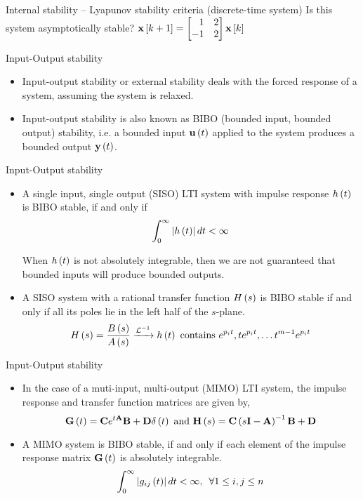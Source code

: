 \documentclass[aspectratio=169]{beamer}
\def\mf{\ensuremath\mathbf}
\def\lp{\ensuremath\left(}
\def\rp{\ensuremath\right)}
\def\lv{\ensuremath\left\lvert}
\def\rv{\ensuremath\right\rvert}
\def\ls{\ensuremath\left[}
\def\rs{\ensuremath\right]}
\def\bmx{\ensuremath\begin{bmatrix*}[r]}
\def\emx{\ensuremath\end{bmatrix*}}
\newcommand{\ct}[1]{\lp #1\rp}
\newcommand{\dt}[1]{\ls #1\rs}
\begin{document}
\begin{frame}[t]{Internal stability -- Lyapunov stability criteria (discrete-time system)}
Is this system asymptotically stable? $\mf{x}\dt{k+1} = \bmx 1 & 2 \\ -1 & 2 \emx\mf{x}\dt{k}$
\end{frame}


\begin{frame}[t]{Input-Output stability}
\begin{itemize}
    \item Input-output stability or external stability deals with the forced response of a system, assuming the system is relaxed.

    \item Input-output stability is also known as BIBO (bounded input, bounded output) stability, i.e. a bounded input $\mf{u}\ct{t}$ applied to the system produces a bounded output $\mf{y}\ct{t}$.
\end{itemize}
\end{frame}


\begin{frame}[t]{Input-Output stability}
\begin{itemize}
    \item A single input, single output (SISO) LTI system with impulse response $h\ct{t}$ is BIBO stable, if and only if
    \[ \int_{0}^{\infty} \lv h\ct{t}\rv dt < \infty \]

    When $h\ct{t}$ is not absolutely integrable, then we are not guaranteed that bounded inputs will produce bounded outputs.

    \item A SISO system with a rational transfer function $H\ct{s}$ is BIBO stable if and only if all its poles lie in the left half of the $s$-plane.
    \[ H\ct{s} = \frac{B\ct{s}}{A\ct{s}} \xrightarrow{\mathcal{L}^{-1}} h\ct{t} \text{ contains } e^{p_i t}, te^{p_i t}, \ldots t^{m-1}e^{p_i t}\]
\end{itemize}
\end{frame}


\begin{frame}[t]{Input-Output stability}
\begin{itemize}
    \item In the case of a muti-input, multi-output (MIMO) LTI system, the impulse response and transfer function matrices are given by,
    \[ \mf{G}\ct{t} = \mf{C}e^{t\mf{A}}\mf{B} + \mf{D}\delta\ct{t} \text{ and } \mf{H}\ct{s} = \mf{C}\ct{s\mf{I} - \mf{A}}^{-1}\mf{B} + \mf{D} \]

    \item A MIMO system is BIBO stable, if and only if each element of the impulse response matrix $\mf{G}\ct{t}$ is absolutely integrable.
    \[ \int_{0}^\infty \lv g_{ij}\ct{t}\rv dt < \infty , \,\,\, \forall 1 \leq i, j \leq n \]
\end{itemize}
\end{frame} 
\end{document}
